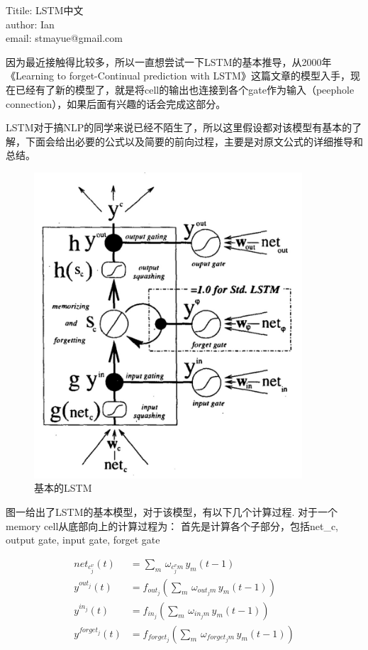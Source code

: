 \documentclass[UTF8]{ctexart}
\begin{document}
\begin{flushleft}
Titile: LSTM中文 \\
author: Ian \\
email: stmayue@gmail.com
\end{flushleft}

因为最近接触得比较多，所以一直想尝试一下LSTM的基本推导，从2000年《Learning to forget-Continual prediction with LSTM》这篇文章的模型入手，现在已经有了新的模型了，就是将cell的输出也连接到各个gate作为输入（peephole connection），如果后面有兴趣的话会完成这部分。

LSTM对于搞NLP的同学来说已经不陌生了，所以这里假设都对该模型有基本的了解，下面会给出必要的公式以及简要的前向过程，主要是对原文公式的详细推导和总结。

\begin{figure}[h!]
    \centering
    \includegraphics[width=10cm]{lstm.png}
    \caption{基本的LSTM}
    \label{fig-sample}
\end{figure}

图一给出了LSTM的基本模型，对于该模型，有以下几个计算过程.
对于一个memory cell从底部向上的计算过程为：
首先是计算各个子部分，包括net\_c, output gate, input gate, forget gate


\begin{align}
net_{c^v_j}(t) &= \sum_m \, \omega_{c^v_{j}m} \, y_{m}(t-1) \\
y^{out_j}(t) &= f_{out_j}(\sum_m \, \omega_{out_{j}m} \, y_{m}(t-1)) \\
y^{in_j}(t) &= f_{in_j}(\sum_m \, \omega_{in_{j}m} \, y_{m}(t-1)) \\
y^{forget_j}(t) &= f_{forget_j}(\sum_m \, \omega_{forget_{j}m} \, y_{m}(t-1))
\end{align}
\end{document}

